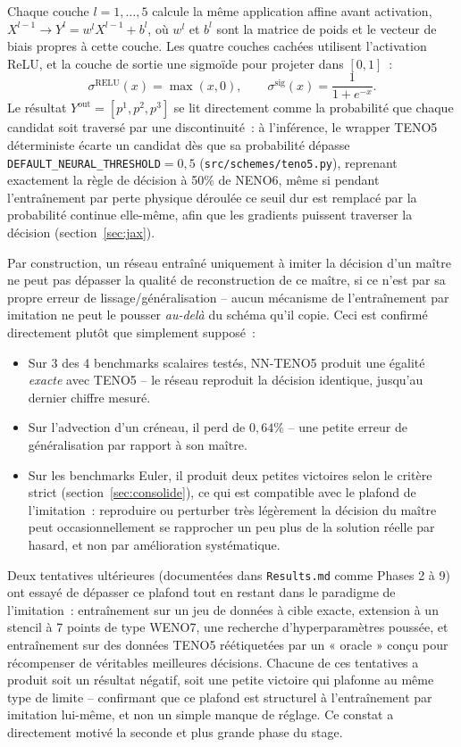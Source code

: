 \documentclass[11pt]{article}
\begin{document}
Chaque couche $l=1,\dots,5$ calcule la même application affine avant
activation, $X^{l-1} \to Y^l = w^l X^{l-1} + b^l$, où $w^l$ et $b^l$ sont
la matrice de poids et le vecteur de biais propres à cette couche. Les
quatre couches cachées utilisent l'activation ReLU, et la couche de
sortie une sigmoïde pour projeter dans $[0,1]$~:
\[
\sigma^{\text{RELU}}(x) = \max(x, 0), \qquad
\sigma^{\text{sig}}(x) = \frac{1}{1+e^{-x}}.
\]
Le résultat $Y^{\text{out}} = [p^1,p^2,p^3]$ se lit directement comme la
probabilité que chaque candidat soit traversé par une discontinuité~: à
l'inférence, le wrapper TENO5 déterministe écarte un candidat dès que sa
probabilité dépasse \texttt{DEFAULT\_NEURAL\_THRESHOLD}$=0{,}5$
(\texttt{src/schemes/teno5.py}), reprenant exactement la règle de
décision à 50\% de NENO6, même si pendant l'entraînement par perte
physique déroulée ce seuil dur est remplacé par la probabilité continue
elle-même, afin que les gradients puissent traverser la décision
(section~\ref{sec:jax}).

Par construction, un réseau entraîné uniquement à imiter la décision d'un
maître ne peut pas dépasser la qualité de reconstruction de ce maître, si
ce n'est par sa propre erreur de lissage/généralisation -- aucun
mécanisme de l'entraînement par imitation ne peut le pousser
\emph{au-delà} du schéma qu'il copie. Ceci est confirmé directement plutôt
que simplement supposé~:

\begin{itemize}
    \item Sur 3 des 4 benchmarks scalaires testés, NN-TENO5 produit une
    égalité \emph{exacte} avec TENO5 -- le réseau reproduit la décision
    identique, jusqu'au dernier chiffre mesuré.
    \item Sur l'advection d'un créneau, il perd de $0,64\%$ -- une petite
    erreur de généralisation par rapport à son maître.
    \item Sur les benchmarks Euler, il produit deux petites victoires
    selon le critère strict (section~\ref{sec:consolide}), ce qui est
    compatible avec le plafond de l'imitation~: reproduire ou perturber
    très légèrement la décision du maître peut occasionnellement se
    rapprocher un peu plus de la solution réelle par hasard, et non par
    amélioration systématique.
\end{itemize}

Deux tentatives ultérieures (documentées dans \texttt{Results.md} comme
Phases 2 à 9) ont essayé de dépasser ce plafond tout en restant dans le
paradigme de l'imitation~: entraînement sur un jeu de données à cible
exacte, extension à un stencil à 7 points de type WENO7, une recherche
d'hyperparamètres poussée, et entraînement sur des données TENO5
réétiquetées par un « oracle » conçu pour récompenser de véritables
meilleures décisions. Chacune de ces tentatives a produit soit un résultat
négatif, soit une petite victoire qui plafonne au même type de limite --
confirmant que ce plafond est structurel à l'entraînement par imitation
lui-même, et non un simple manque de réglage. Ce constat a directement
motivé la seconde et plus grande phase du stage.
\end{document}
